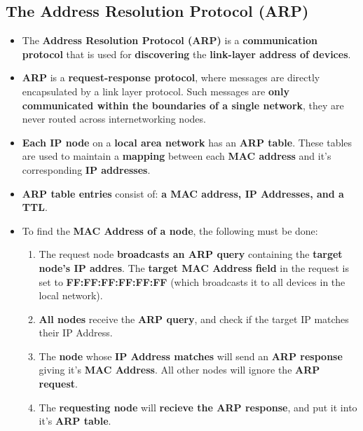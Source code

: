 \documentclass{article}
\begin{document}
    \subsection*{The Address Resolution Protocol (ARP)}
    \begin{itemize}
        \item The \textbf{Address Resolution Protocol (ARP)} is a \textbf{communication protocol} that is used for \textbf{discovering} the \textbf{link-layer address of devices}.
        \item \textbf{ARP} is a \textbf{request-response protocol}, where messages are directly encapsulated by a link layer protocol. Such messages are \textbf{only communicated within the boundaries of a single network}, they are never routed across internetworking nodes.
        \item \textbf{Each IP node} on a \textbf{local area network} has an \textbf{ARP table}. These tables are used to maintain a \textbf{mapping} between each \textbf{MAC address} and it's corresponding \textbf{IP addresses}.
        \item \textbf{ARP table entries} consist of: \textbf{a MAC address, IP Addresses, and a TTL}.
        \item To find the \textbf{MAC Address of a node}, the following must be done:
        \begin{enumerate}
            \item The request node \textbf{broadcasts an ARP query} containing the \textbf{target node's IP addres}. The \textbf{target MAC Address field} in the request is set to \textbf{FF:FF:FF:FF:FF:FF} (which broadcasts it to all devices in the local network).
            \item \textbf{All nodes} receive the \textbf{ARP query}, and check if the target IP matches their IP Address.
            \item The \textbf{node} whose \textbf{IP Address matches} will send an \textbf{ARP response} giving it's \textbf{MAC Address}. All other nodes will ignore the \textbf{ARP request}.
            \item The \textbf{requesting node} will \textbf{recieve the ARP response}, and put it into it's \textbf{ARP table}.
        \end{enumerate}
    \end{itemize}
\end{document}
